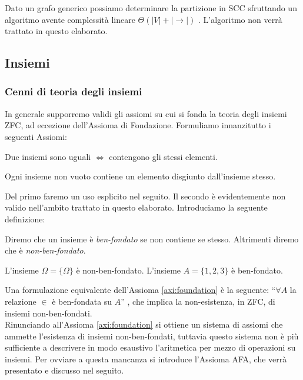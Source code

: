 Dato un grafo generico possiamo determinare la partizione in SCC sfruttando un algoritmo avente complessità lineare $\Theta(|V| + |\to|)$ \cite{tarjan}. L'algoritmo non verrà trattato in questo elaborato.

\subsection{Insiemi}
\subsubsection{Cenni di teoria degli insiemi}
In generale supporremo validi gli assiomi su cui si fonda la teoria degli insiemi ZFC, ad eccezione dell'Assioma di Fondazione. Formuliamo innanzitutto i seguenti Assiomi:
\begin{axiom}[di estensionalità]
    Due insiemi sono uguali $\iff$ contengono gli stessi elementi.
\end{axiom}
\begin{axiom}[di fondazione]
    Ogni insieme non vuoto contiene un elemento disgiunto dall'insieme stesso.
    \label{axi:foundation}
\end{axiom}
Del primo faremo un uso esplicito nel seguito. Il secondo è evidentemente non valido nell'ambito trattato in questo elaborato. Introduciamo la seguente definizione:
\begin{definition}
    Diremo che un insieme è \emph{ben-fondato} se non contiene se stesso. Altrimenti diremo che è \emph{non-ben-fondato}.
\end{definition}
\begin{example}
    L'insieme $\Omega = \{\Omega\}$ è non-ben-fondato. L'insieme $A = \{1,2,3\}$ è ben-fondato.
\end{example}
Una formulazione equivalente dell'Assioma \ref*{axi:foundation} è la seguente: ``$\forall A$ la relazione $\in$ è ben-fondata su $A$'' \cite[Chapter III.4]{kunen}, che implica la non-esistenza, in ZFC, di insiemi non-ben-fondati.\\
Rinunciando all'Assioma \ref*{axi:foundation} si ottiene un sistema di assiomi che ammette l'esistenza di insiemi non-ben-fondati, tuttavia questo sistema non è più sufficiente a descrivere in modo esaustivo l'aritmetica per mezzo di operazioni su insiemi. Per ovviare a questa mancanza si introduce l'Assioma AFA, che verrà presentato e discusso nel seguito.



